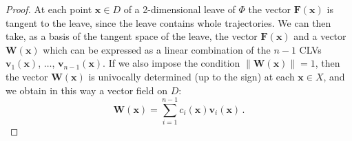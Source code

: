 \documentclass{article}
\theoremstyle{plain}
\theoremstyle{definition}
\theoremstyle{remark}
\newcommand{\vect}[1]{\boldsymbol{#1}}
\begin{document}
\begin{proof}
At each point $\vect{x}\in D$ of a 2-dimensional leave 
of $\Phi$ the vector $\vect{F}(\vect{x})$ is tangent to the leave, 
since the leave contains whole trajectories. We can then take,
as a  basis of the tangent space of the leave, the vector
$\vect{F}(\vect{x})$ and a vector $\vect{W}(\vect{x})$ which can be
  expressed as a linear combination of the $n-1$ CLVs 
$\vect{v}_1(\vect{x})$, $\dots$,  $\vect{v}_{n-1}(\vect{x})$.
If we also impose the condition
$\lVert \vect{W}(\vect{x})\rVert =1$, then the vector $\vect{W}
(\vect{x})$ is univocally determined (up to the sign)
at each $\vect{x}\in X$, and we
obtain in this way a vector field on $D$:
  \begin{equation} \label{eq:geo:def:W}
    \vect{W}(\vect{x}) = \sum_{i=1}^{n-1} c_i (\vect{x})
\vect{v}_i (\vect{x})\,.
  \end{equation}
  

\end{proof}
\end{document}
